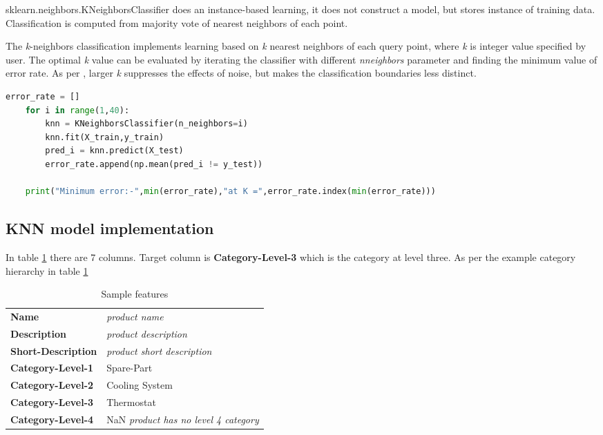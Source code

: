 sklearn.neighbors.KNeighborsClassifier \parencite{scikit-learn} does an instance-based learning, it does not construct a model, but stores instance of training data. Classification is computed from majority vote of nearest neighbors of each point.

The \textit{k}-neighbors classification implements learning based on  \textit{k} nearest neighbors of each query point, where \textit{k} is integer value specified by user. The optimal \textit{k} value can be evaluated by iterating the classifier with different  \textit{n\textunderscore neighbors} parameter and finding the minimum value of error rate. As per \parencite{scikit-learn}, larger \textit{k} suppresses the effects of noise, but makes the classification boundaries less distinct.

\begin{lstlisting}[language=Python, caption={Find optimal \textit{k} value in \acl{KNN} }]
    error_rate = []
    for i in range(1,40):
        knn = KNeighborsClassifier(n_neighbors=i)
        knn.fit(X_train,y_train)
        pred_i = knn.predict(X_test)
        error_rate.append(np.mean(pred_i != y_test))

    print("Minimum error:-",min(error_rate),"at K =",error_rate.index(min(error_rate)))
\end{lstlisting}



\subsection{\acs{KNN} model implementation}

In table \ref{table:KNN_implementation} there are 7 columns. Target column is \textbf{Category-Level-3} which is the category at level three.
As per the example category hierarchy in table \ref{table:KNN_implementation} 



\begin{table}[h]
    \centering
    \caption{Sample features }
    \label{table:KNN_implementation}
    \begin{tabular}{ll}
        \toprule     
        \textbf{Name}& \textit{product name} \\
        \textbf{Description}& \textit{product description} \\
        \textbf{Short-Description}& \textit{product short description} \\
        \textbf{Category-Level-1}& Spare-Part \\
        \textbf{Category-Level-2}& Cooling System \\
        \textbf{Category-Level-3}& Thermostat \\
        \textbf{Category-Level-4}& NaN \textit{product has no level 4 category} \\
        \bottomrule
    \end{tabular}

\end{table}

